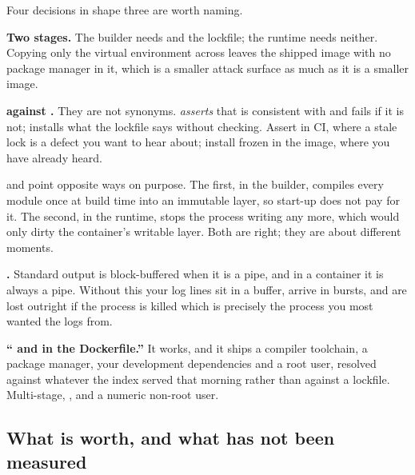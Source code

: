 
\noindent
Four decisions in shape three are worth naming.

\textbf{Two stages.} The builder needs  and the lockfile; the
runtime needs neither. Copying only the virtual environment across leaves
the shipped image with no package manager in it, which is a smaller attack
surface as much as it is a smaller image.

\textbf{ against .} They are not
synonyms.  \emph{asserts} that  is
consistent with  and fails if it is not;
 installs what the lockfile says without checking.
Assert in CI, where a stale lock is a defect you want to hear about;
install frozen in the image, where you have already heard.

 and  point
opposite ways on purpose. The first, in the builder, compiles every module
once at build time into an immutable layer, so start-up does not pay for
it. The second, in the runtime, stops the process writing any more, which
would only dirty the container's writable layer. Both are right; they are
about different moments.

\textbf{.} Standard output is block-buffered when
it is a pipe, and in a container it is always a pipe. Without this your
log lines sit in a buffer, arrive in bursts, and are lost outright if the
process is killed \dash{} which is precisely the process you most wanted
the logs from.

\begin{trapbox}
\textbf{\enquote{ and  in the
Dockerfile.}} It works, and it ships a compiler toolchain, a package
manager, your development dependencies and a root user, resolved against
whatever the index served that morning rather than against a lockfile.
Multi-stage, , and a numeric
non-root user.
\end{trapbox}

\subsection{What  is worth, and what has not been measured}
\label{sec:ch12-measured}

